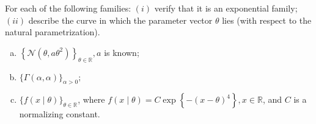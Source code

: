 \begin{ex}
	For each of the following families: \((i)\) verify that it is an exponential family; \((i i)\) describe the curve in which the parameter vector \(\theta\) lies (with respect to the natural parametrization).
	\begin{enumerate}[(a)]
		\item \(\left\{\mathcal{N}\left(\theta, a \theta^{2}\right)\right\}_{\theta \in \mathbb{R}}, a\) is known;
		\item \(\{\Gamma(\alpha, \alpha)\}_{\alpha>0} ;\)
		\item \(\{f(x \mid \theta)\}_{\theta \in \mathbb{R}}\), where \(f(x \mid \theta)=C \exp \left\{-(x-\theta)^{4}\right\}, x \in \mathbb{R}\), and \(C\) is a normalizing constant.
	\end{enumerate}
\end{ex}

